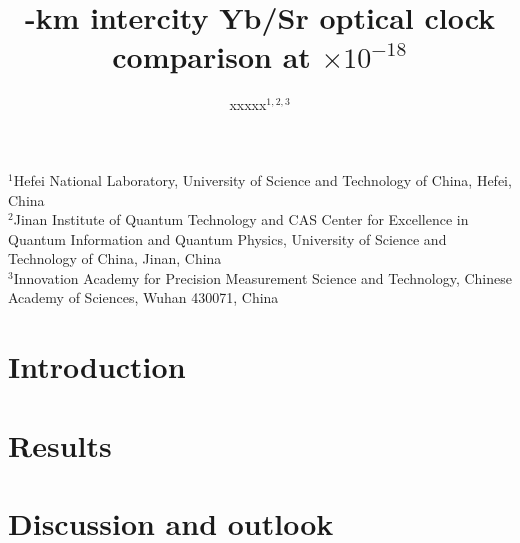 \documentclass[11pt,a4paper]{article}
\title{\siteKm-km intercity Yb/Sr optical clock comparison at
\uTotalShort$\times10^{-18}$}
\author{%
  xxxxx$^{1,2,3}$%
}
\date{}
\begin{document}
\maketitle

\begin{center}
{\small
$^{1}$Hefei National Laboratory, University of Science and Technology of China, Hefei, China\\
$^{2}$Jinan Institute of Quantum Technology and CAS Center for Excellence in Quantum Information and Quantum Physics, University of Science and Technology of China, Jinan, China\\
$^{3}$Innovation Academy for Precision Measurement Science and Technology, Chinese Academy of Sciences, Wuhan 430071, China
}
\end{center}

\begin{abstract}
\sloppy

\end{abstract}

\section*{Introduction}
\label{sec:intro}


\section*{Results}
\label{sec:results}


\section*{Discussion and outlook}
\label{sec:discussion}

\end{document}
